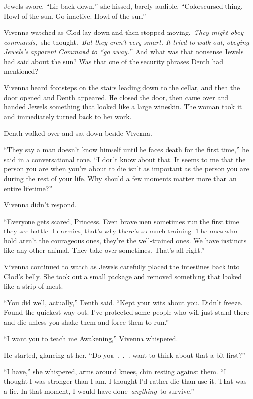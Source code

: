 Jewels swore. “Lie back down,” she hissed, barely audible. “Colorscursed thing. Howl of the sun. Go inactive. Howl of the sun.”

Vivenna watched as Clod lay down and then stopped moving.~\textit{They might obey commands,}~she thought.~\textit{But they aren’t very smart. It tried to walk out, obeying Jewels’s apparent Command to “go away.”}~And what was that nonsense Jewels had said about the sun? Was that one of the security phrases Denth had mentioned?

Vivenna heard footsteps on the stairs leading down to the cellar, and then the door opened and Denth appeared. He closed the door, then came over and handed Jewels something that looked like a large wineskin. The woman took it and immediately turned back to her work.

Denth walked over and sat down beside Vivenna.

“They say a man doesn’t know himself until he faces death for the first time,” he said in a conversational tone. “I don’t know about that. It seems to me that the person you are when you’re about to die isn’t as important as the person you are during the rest of your life. Why should a few moments matter more than an entire lifetime?”

Vivenna didn’t respond.

“Everyone gets scared, Princess. Even brave men sometimes run the first time they see battle. In armies, that’s why there’s so much training. The ones who hold aren’t the courageous ones, they’re the well-trained ones. We have instincts like any other animal. They take over sometimes. That’s all right.”

Vivenna continued to watch as Jewels carefully placed the intestines back into Clod’s belly. She took out a small package and removed something that looked like a strip of meat.

“You did well, actually,” Denth said. “Kept your wits about you. Didn’t freeze. Found the quickest way out. I’ve protected some people who will just stand there and die unless you shake them and force them to run.”

“I want you to teach me Awakening,” Vivenna whispered.

He started, glancing at her. “Do you~.~.~. want to think about that a bit first?”

“I have,” she whispered, arms around knees, chin resting against them. “I thought I was stronger than I am. I thought I’d rather die than use it. That was a lie. In that moment, I would have done~\textit{anything}~to survive.”

